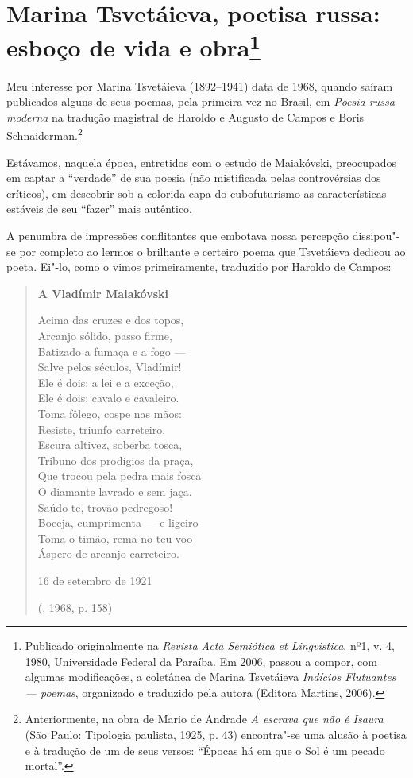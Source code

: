 \chapter{Marina Tsvetáieva, poetisa russa:\\
esboço de vida e obra\footnote{Publicado originalmente na \emph{Revista Acta
Semiótica et Lingvistica}, nº1, v. 4, 1980, Universidade Federal
da Paraíba. Em 2006, passou a compor, com algumas modificações,
a coletânea de Marina Tsvetáieva \emph{Indícios Flutuantes ---
poemas}, organizado e traduzido pela autora (Editora Martins, 2006).}}
\label{marina}

Meu interesse por Marina Tsvetáieva (1892--1941) data de 1968,
quando saíram publicados alguns de seus poemas, pela primeira vez
no Brasil, em \emph{Poesia russa moderna} na tradução magistral de
Haroldo e Augusto de Campos e Boris Schnaiderman.\footnote{Anteriormente,
na obra de Mario de Andrade \emph{A escrava que não é Isaura}
(São Paulo: Tipologia paulista, 1925, p. 43) encontra"-se uma
alusão à poetisa e à tradução de um de seus versos: ``Épocas há
em que o Sol é um pecado mortal''.}

Estávamos, naquela época, entretidos com o estudo de Maiakóvski,
preocupados em captar a ``verdade'' de sua poesia (não mistificada
pelas controvérsias dos críticos), em descobrir sob a colorida capa
do cubofuturismo as características estáveis de seu ``fazer'' mais
autêntico.

A penumbra de impressões conflitantes que embotava nossa percepção
dissipou"-se por completo ao lermos o brilhante e certeiro poema
que Tsvetáieva dedicou ao poeta. Ei"-lo, como o vimos primeiramente,
traduzido por Haroldo de Campos:

\begin{verse}
\textbf{A Vladímir Maiakóvski}

Acima das cruzes e dos topos, \\
Arcanjo sólido, passo firme, \\
Batizado a fumaça e a fogo --- \\
Salve pelos séculos, Vladímir! \\[8pt]
Ele é dois: a lei e a exceção, \\
Ele é dois: cavalo e cavaleiro. \\
Toma fôlego, cospe nas mãos: \\
Resiste, triunfo carreteiro. \\[8pt]
Escura altivez, soberba tosca, \\
Tribuno dos prodígios da praça, \\
Que trocou pela pedra mais fosca \\
O diamante lavrado e sem jaça. \\[8pt]
Saúdo-te, trovão pedregoso! \\
Boceja, cumprimenta --- e ligeiro \\
Toma o timão, rema no teu voo \\
Áspero de arcanjo carreteiro. 

16 de setembro de 1921

(, 1968, p. 158)
\end{verse}

